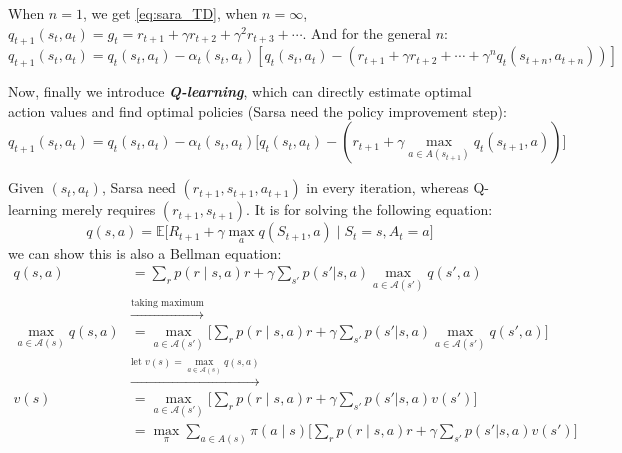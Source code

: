 \documentclass[10pt]{elegantbook}
\newcommand{\mydefination}[1]{\textbf{\textit{\textcolor{structurecolor}{#1}}}}
\begin{document}
When $n=1$, we get \ref{eq:sara_TD}, when $n=\infty$, $q_{t+1}(s_t, a_t) = g_t = r_{t+1} + \gamma r_{t+2} + \gamma^2 r_{t+3} + \cdots$.
And for the general $n$:
\[
    q_{t+1}(s_t, a_t) = q_t(s_t, a_t) - \alpha_t(s_t, a_t) [q_t(s_t, a_t) - (r_{t+1} + \gamma r_{t+2} + \cdots + \gamma^n q_t(s_{t+n}, a_{t+n}))]
\]

Now, finally we introduce \mydefination{Q-learning}, which can directly estimate optimal action values and find
optimal policies (Sarsa need the policy improvement step):
\begin{equation} \label{eq:q_learning}
    q_{t+1}(s_t, a_t) = q_t(s_t, a_t) - \alpha_t(s_t, a_t) \big [ q_t(s_t, a_t) - (r_{t+1} + \gamma \max_{a \in A(s_{t+1})} q_t(s_{t+1}, a)) \big ]
\end{equation}

Given $(s_t, a_t)$, Sarsa need $(r_{t+1}, s_{t+1}, a_{t+1})$ in every iteration, whereas Q-learning merely requires $(r_{t+1}, s_{t+1})$.
It is for solving the following equation:
\begin{equation}
    q(s, a) = \mathbb E \big [ R_{t+1} + \gamma \max_a q(S_{t+1}, a) \mid S_t = s, A_t = a \big ]
\end{equation}
we can show this is also a Bellman equation:
\begin{align*}
    q(s, a) &= \sum_r p(r \mid s, a)r + \gamma \sum_{s'}p(s' | s, a) \max_{a \in \mathcal A(s')} q(s', a) \\
    & \xrightarrow{\text{taking maximum}} \\
    \max_{a \in \mathcal A(s)} q(s, a) & = \max_{a \in \mathcal A(s')} \big [ \sum_r p(r \mid s, a)r + \gamma \sum_{s'}p(s' | s, a) \max_{a \in \mathcal A(s')} q(s', a) \big ] \\
    & \xrightarrow{\text{let } v(s) = \max_{a \in \mathcal A(s)} q(s, a)} \\
    v(s) &= \max_{a \in \mathcal A(s')} \big [ \sum_r p(r \mid s, a)r + \gamma \sum_{s'}p(s' | s, a) v(s') \big ] \\
            &= \max_{\pi} \sum_{a \in A(s)} \pi(a \mid s) \big [ \sum_r p(r \mid s, a)r + \gamma \sum_{s'}p(s' | s, a) v(s') \big ]
\end{align*}
\end{document}

